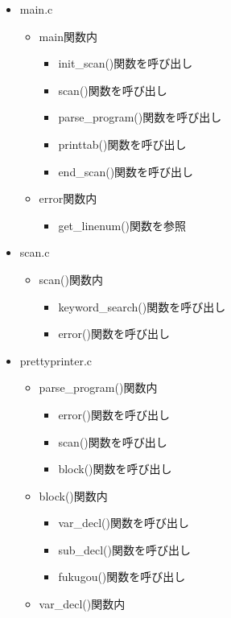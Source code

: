 \documentclass{jarticle}
\begin{document}
\begin{itemize}
  \item main.c
  \begin{itemize}
    \item main関数内
    \begin{itemize}
      \item init\_scan()関数を呼び出し
      \item scan()関数を呼び出し
      \item parse\_program()関数を呼び出し
      \item printtab()関数を呼び出し
      \item end\_scan()関数を呼び出し
    \end{itemize}
    \item error関数内
    \begin{itemize}
      \item get\_linenum()関数を参照
    \end{itemize}
  \end{itemize}
  \item scan.c
  \begin{itemize}
    \item scan()関数内
    \begin{itemize}
      \item keyword\_search()関数を呼び出し
      \item error()関数を呼び出し
    \end{itemize}
  \end{itemize}
  \item prettyprinter.c
  \begin{itemize}
    \item parse\_program()関数内
    \begin{itemize}
      \item error()関数を呼び出し
      \item scan()関数を呼び出し
      \item block()関数を呼び出し
    \end{itemize}
    \item block()関数内
    \begin{itemize}
      \item var\_decl()関数を呼び出し
      \item sub\_decl()関数を呼び出し
      \item fukugou()関数を呼び出し
    \end{itemize}
    \item var\_decl()関数内
    \begin{itemize}

\end{itemize}
\end{itemize}
\end{itemize}
\end{document}
